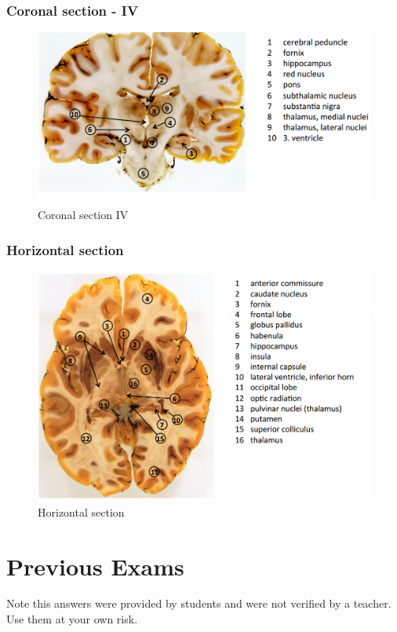 \documentclass[12pt,article,oneside,a4paper]{memoir}
\begin{document}
\subsubsection{Coronal section - IV}
\begin{figure}[H]
	\centering
  	\includegraphics[width=\linewidth]{imgs/coronal-section-IV-answer.png}
	\caption{Coronal section IV}
  	\label{fig:coronalSectionIV-answer}
\end{figure}

\subsubsection{Horizontal section}
\begin{figure}[H]
	\centering
  	\includegraphics[width=\linewidth]{imgs/horizontal-section-answer.png}
	\caption{Horizontal section}
  	\label{fig:horizontalSection-answer}
\end{figure}

\newpage
\section{Previous Exams}
Note this answers were provided by students and were not verified by a teacher. Use them at your own risk.
\end{document}
